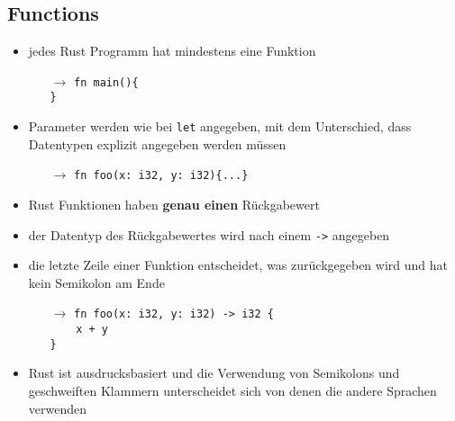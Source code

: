 \documentclass[a4paper,12pt]{article}
\begin{document}
\subsection{Functions}
	\begin{itemize}
	  \item jedes Rust Programm hat mindestens eine Funktion 
	  \begin{itemize}
	      \item[$\rightarrow$] \verb|fn main(){|\\ \verb|}| 
	  \end{itemize}
	  \item Parameter werden wie bei \verb|let| angegeben, mit dem Unterschied, dass Datentypen explizit angegeben werden müssen 
	  \begin{itemize}
	      \item[$\rightarrow$] \verb|fn foo(x: i32, y: i32){...}| 
	  \end{itemize}
	  \item Rust Funktionen haben \textbf{genau einen} Rückgabewert 
	  \item der Datentyp des Rückgabewertes wird nach einem \verb|->| angegeben
	  \item die letzte Zeile einer Funktion entscheidet, was zurückgegeben wird und hat kein Semikolon am Ende
	  \begin{itemize}
	      \item[$\rightarrow$] \verb|fn foo(x: i32, y: i32) -> i32 {| \\ 
	      \verb|    x + y|\\ \verb|}| 
	  \end{itemize}
	  \item Rust ist ausdrucksbasiert und die Verwendung von Semikolons und geschweiften Klammern unterscheidet sich von denen die andere Sprachen verwenden
	\end{itemize}
\end{document}
